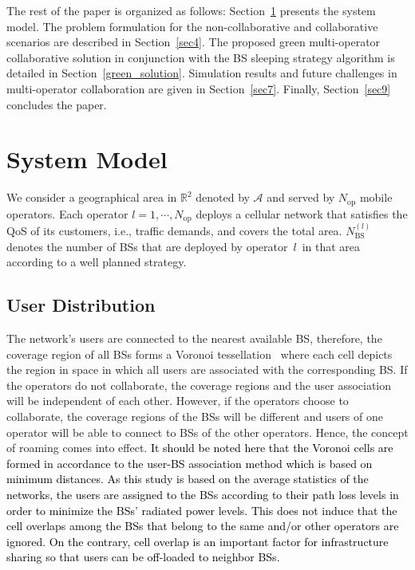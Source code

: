 \documentclass[10pt, letter, twocolumn]{IEEEtran}
\begin{document}
The rest of the paper is organized as follows: Section~\ref{sec3} presents the system model. The problem formulation for the non-collaborative and collaborative scenarios are described in Section~\ref{sec4}. The proposed green multi-operator collaborative solution in conjunction with the BS sleeping strategy algorithm is detailed in Section~\ref{green_solution}. Simulation results and future challenges in multi-operator collaboration are given in Section~\ref{sec7}. Finally, Section~\ref{sec9} concludes the paper.
\section{System Model}
\label{sec3}
We consider a geographical area in $\mathbb{R}^{2}$ denoted by $\mathcal{A}$ and served by $N_{\text{op}}$ mobile operators. Each operator $l=1,\cdots, N_{\text{op}}$ deploys a cellular network that satisfies the QoS of its customers, i.e., traffic demands, and covers the total area. $N_{\text{BS}}^{(l)}$ denotes the number of BSs that are deployed by operator~$l$~in that area according to a well planned strategy.

\subsection{User Distribution}
The network's users are connected to the nearest available BS, therefore, the coverage region of all BSs forms a Voronoi tessellation~\cite{voronoi} where each cell depicts the region in space in which all users are associated with the corresponding BS. If the operators do not collaborate, the coverage regions and the user association will be independent of each other. However, if the operators choose to collaborate, the coverage regions of the BSs will be different and users of one operator will be able to connect to BSs of the other operators. Hence, the concept of roaming comes into effect. \textcolor{black}{It should be noted here that the Voronoi cells are formed in accordance to the user-BS association method which is based on minimum distances. As this study is based on the average statistics of the networks, the users are assigned to the BSs according to their path loss levels in order to minimize the BSs' radiated power levels. This does not induce that the cell overlaps among the BSs that belong to the same and/or other operators are ignored. On the contrary, cell overlap is an important factor for infrastructure sharing so that users can be off-loaded to neighbor BSs.}
\end{document}
